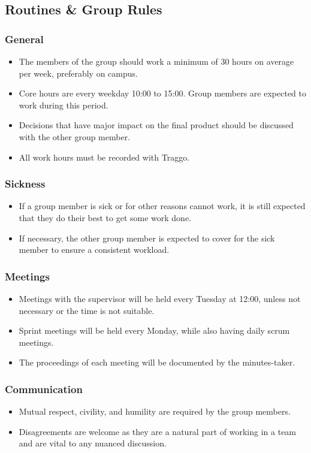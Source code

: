 \subsection{Routines \& Group Rules}

\subsubsection{General}
\begin{itemize}
    \item The members of the group should work a minimum of 30 hours on average per week, preferably on campus.
    \item Core hours are every weekday 10:00 to 15:00. Group members are expected to work during this period.
    \item Decisions that have major impact on the final product should be discussed with the other group member.
    \item All work hours must be recorded with Traggo.
\end{itemize}

\subsubsection{Sickness}
\begin{itemize}
    \item If a group member is sick or for other reasons cannot work, it is still expected that they do their best to get some work done.
    \item If necessary, the other group member is expected to cover for the sick member to ensure a consistent workload.
\end{itemize}

\subsubsection{Meetings}
\begin{itemize}
    \item Meetings with the supervisor will be held every Tuesday at 12:00, unless not necessary or the time is not suitable.
    \item Sprint meetings will be held every Monday, while also having daily scrum meetings.
    \item The proceedings of each meeting will be documented by the minutes-taker.
\end{itemize}

\subsubsection{Communication}
\begin{itemize}
    \item Mutual respect, civility, and humility are required by the group members.
    \item Disagreements are welcome as they are a natural part of working in a team and are vital to any nuanced discussion.
\end{itemize}

